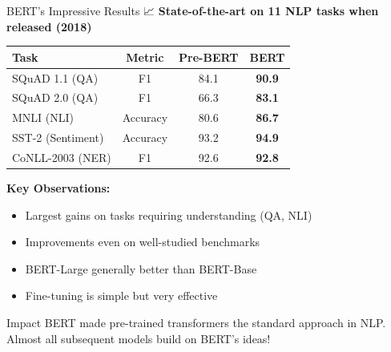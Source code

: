 \documentclass[aspectratio=169]{beamer}
\begin{document}
\begin{frame}{BERT's Impressive Results 📈}
\textbf{State-of-the-art on 11 NLP tasks when released (2018)}

\vspace{1em}

\begin{center}
\small
\begin{tabular}{lccc}
\toprule
\textbf{Task} & \textbf{Metric} & \textbf{Pre-BERT} & \textbf{BERT} \\
\midrule
SQuAD 1.1 (QA) & F1 & 84.1 & \textbf{90.9} \\
SQuAD 2.0 (QA) & F1 & 66.3 & \textbf{83.1} \\
MNLI (NLI) & Accuracy & 80.6 & \textbf{86.7} \\
SST-2 (Sentiment) & Accuracy & 93.2 & \textbf{94.9} \\
CoNLL-2003 (NER) & F1 & 92.6 & \textbf{92.8} \\
\bottomrule
\end{tabular}
\end{center}

\vspace{1em}

\textbf{Key Observations:}
\begin{itemize}\setlength{\itemsep}{0pt}
    \item Largest gains on tasks requiring understanding (QA, NLI)
    \item Improvements even on well-studied benchmarks
    \item BERT-Large generally better than BERT-Base
    \item Fine-tuning is simple but very effective
\end{itemize}

\vspace{1em}

\begin{block}{Impact}
BERT made pre-trained transformers the standard approach in NLP. Almost all subsequent models build on BERT's ideas!
\end{block}
\end{frame}
\end{document}
